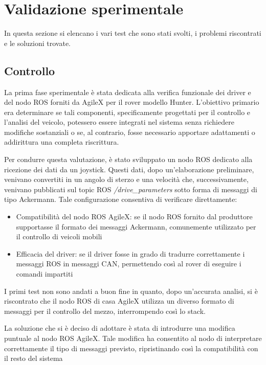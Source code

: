 \chapter{Validazione sperimentale}
In questa sezione si elencano i vari test che sono stati svolti, i problemi riscontrati e le soluzioni trovate.

\section{Controllo}
La prima fase sperimentale è stata dedicata alla verifica funzionale dei driver e del nodo ROS forniti da AgileX per il rover modello Hunter. L'obiettivo primario era determinare se tali componenti, specificamente progettati per il controllo e l'analisi del veicolo, potessero essere integrati nel sistema senza richiedere modifiche sostanziali o se, al contrario, fosse necessario apportare adattamenti o addirittura una completa riscrittura.

\noindent Per condurre questa valutazione, è stato sviluppato un nodo ROS dedicato alla ricezione dei dati da un joystick. Questi dati, dopo un'elaborazione preliminare, venivano convertiti in un angolo di sterzo e una velocità che, successivamente, venivano pubblicati sul topic ROS \textit{/drive\_parameters} sotto forma di messaggi di tipo Ackermann. Tale configurazione consentiva di verificare direttamente:

\begin{itemize}
  \item Compatibilità del nodo ROS AgileX: se il nodo ROS fornito dal produttore supportasse il formato dei messaggi Ackermann, comunemente utilizzato per il controllo di veicoli mobili
  \item Efficacia del driver: se il driver fosse in grado di tradurre correttamente i messaggi ROS in messaggi CAN, permettendo così al rover di eseguire i comandi impartiti
\end{itemize}

\noindent I primi test non sono andati a buon fine in quanto, dopo un'accurata analisi, si è riscontrato che il nodo ROS di casa AgileX utilizza un diverso formato di messaggi per il controllo del mezzo, interrompendo così lo stack.

\noindent La soluzione che si è deciso di adottare è stata di introdurre una modifica puntuale al nodo ROS AgileX. Tale modifica ha consentito al nodo di interpretare correttamente il tipo di messaggi previsto, ripristinando così la compatibilità con il resto del sistema

